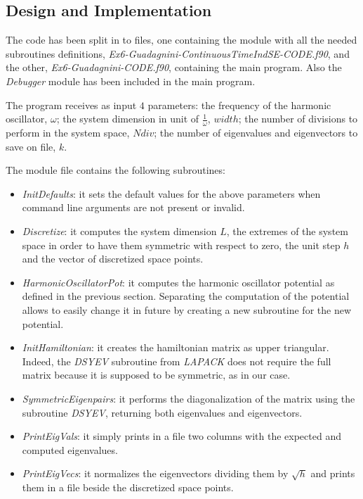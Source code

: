 \documentclass[11pt,a4paper]{article}
\begin{document}
\subsection{Design and Implementation}
The code has been split in to files, one containing the module with all the needed subroutines definitions, \textit{Ex6-Guadagnini-ContinuousTimeIndSE-CODE.f90}, and the other, \textit{Ex6-Guadagnini-CODE.f90}, containing the main program.
Also the \textit{Debugger} module has been included in the main program.

The program receives as input $4$ parameters: 
the frequency of the harmonic oscillator, $\omega$; 
the system dimension in unit of $\frac{1}{\omega}$, $width$; 
the number of divisions to perform in the system space, $Ndiv$; 
the number of eigenvalues and eigenvectors to save on file, $k$.

The module file contains the following subroutines:
\begin{itemize}
	\item \textit{InitDefaults}: it sets the default values for the above parameters when command line arguments are not present or invalid. 
	\item \textit{Discretize}: it computes the system dimension $L$, the extremes of the system space in order to have them symmetric with respect to zero, the unit step $h$ and the vector of discretized space points.
	\item \textit{HarmonicOscillatorPot}: it computes the harmonic oscillator potential as defined in the previous section. Separating the computation of the potential allows to easily change it in future by creating a new subroutine for the new potential.
	\item \textit{InitHamiltonian}: it creates the hamiltonian matrix as upper triangular. Indeed, the \textit{DSYEV} subroutine from \textit{LAPACK} does not require the full matrix because it is supposed to be symmetric, as in our case.
	\item \textit{SymmetricEigenpairs}: it performs the diagonalization of the matrix using the subroutine \textit{DSYEV}, returning both eigenvalues and eigenvectors.
	\item \textit{PrintEigVals}: it simply prints in a file two columns with the expected and computed eigenvalues.
	\item \textit{PrintEigVecs}: it normalizes the eigenvectors dividing them by $\sqrt{h}$ and prints them in a file beside the discretized space points.
\end{itemize}
\end{document}
